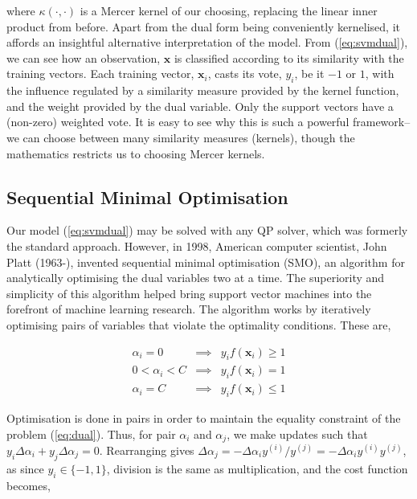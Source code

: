 \documentclass[11pt]{amsart}
\begin{document}
where $\kappa(\cdot, \cdot)$ is a Mercer kernel of our choosing, replacing the linear inner product from before. Apart from the dual form being conveniently kernelised, it affords an insightful alternative interpretation of the model. From (\ref{eq:svmdual}), we can see how an observation, $\mathbf{x}$ is classified according to its similarity with the training vectors. Each training vector, $\mathbf{x}_i$, casts its vote, $y_i$, be it $-1$ or $1$, with the influence regulated by a similarity measure provided by the kernel function, and the weight provided by the dual variable. Only the support vectors have a (non-zero) weighted vote. It is easy to see why this is such a powerful framework--we can choose between many similarity measures (kernels), though the mathematics restricts us to choosing Mercer kernels.

\subsection{Sequential Minimal Optimisation}

Our model (\ref{eq:svmdual}) may be solved with any QP solver, which was formerly the standard approach. However, in 1998, American computer scientist, John Platt (1963-), invented sequential minimal optimisation (SMO), an algorithm for analytically optimising the dual variables two at a time. The superiority and simplicity of this algorithm helped bring support vector machines into the forefront of machine learning research. The algorithm works by iteratively optimising pairs of variables that violate the optimality conditions. These are,

\begin{equation}
\begin{array}{rcl}
\alpha_i = 0 & \implies & y_if(\mathbf{x}_i) \geq 1 \\
0 < \alpha_i < C  & \implies & y_if(\mathbf{x}_i) = 1 \\
\alpha_i = C & \implies & y_if(\mathbf{x}_i) \leq 1
\end{array}
\label{eq:svmkkt}
\end{equation}

Optimisation is done in pairs in order to maintain the equality constraint of the problem (\ref{eq:dual}). Thus, for pair $\alpha_i$ and $\alpha_j$, we make updates such that $y_i\Delta\alpha_i + y_j\Delta\alpha_j = 0$. Rearranging gives $\Delta\alpha_j = -\Delta\alpha_iy^{(i)}/y^{(j)} = -\Delta\alpha_iy^{(i)}y^{(j)}$, as since $y_i \in \{-1, 1\}$, division is the same as multiplication, and the cost function becomes,
\end{document}
